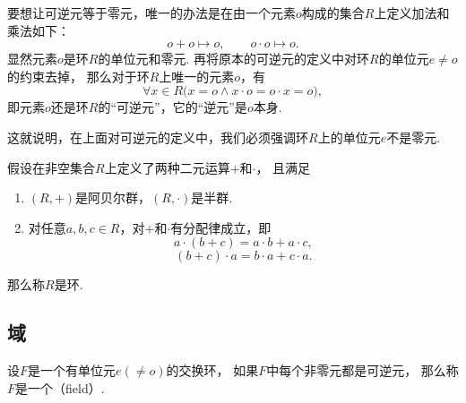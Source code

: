 \begin{example}
要想让可逆元等于零元，唯一的办法是在由一个元素\(o\)构成的集合\(R\)上定义加法和乘法如下：\[
    o + o \mapsto o,
    \qquad
    o \cdot o \mapsto o.
\]
显然元素\(o\)是环\(R\)的单位元和零元.
再将原本的可逆元的定义中对环\(R\)的单位元\(e \neq o\)的约束去掉，
那么对于环\(R\)上唯一的元素\(o\)，有\[
    \forall x \in R \bigl( x = o \land x \cdot o = o \cdot x = o \bigr),
\]
即元素\(o\)还是环\(R\)的“可逆元”，它的“逆元”是\(o\)本身.

这就说明，在上面对可逆元的定义中，我们必须强调环\(R\)上的单位元\(e\)不是零元.
\end{example}

\begin{theorem}
假设在非空集合\(R\)上定义了两种二元运算\(+\)和\(\cdot\)，
且满足\begin{enumerate}
    \item \((R,+)\)是阿贝尔群，\((R,\cdot)\)是半群.

    \item 对任意\(a,b,c \in R\)，对\(+\)和\(\cdot\)有分配律成立，即\[
        a \cdot (b + c) = a \cdot b + a \cdot c,
    \]\[
        (b + c) \cdot a = b \cdot a + c \cdot a.
    \]
\end{enumerate}
那么称\(R\)是环.
\end{theorem}

\subsection{域}
\begin{definition}
设\(F\)是一个有单位元\(e(\neq o)\)的交换环，
如果\(F\)中每个非零元都是可逆元，
那么称\(F\)是一个（field）.
\end{definition}

